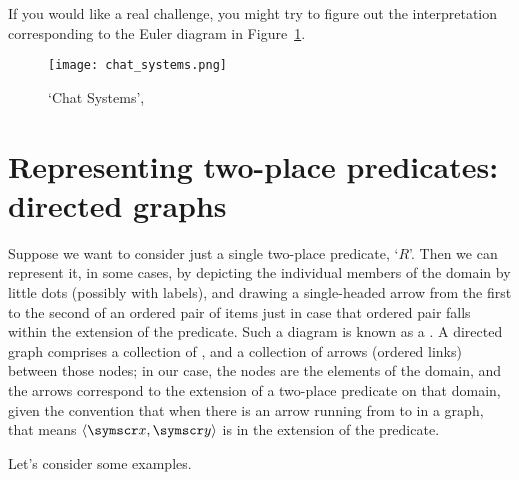 If you would like a real challenge, you might try to figure out the interpretation corresponding to the Euler diagram in Figure~\ref{fig:xkcd}. 
\begin{figure}[b]
	\texttt{[image: chat\_systems.png]}
\caption{`Chat Systems', \label{fig:xkcd}}
\end{figure}

\section{Representing two-place predicates: directed graphs} \label{graph}

Suppose we want to consider just a single two-place predicate, `$R$'. Then we can represent it, in some cases, by depicting the individual members of the domain by little dots (possibly with labels), and drawing a single-headed arrow from the first to the second of an ordered pair of items just in case that ordered pair falls within the extension of the predicate. Such a diagram is known as a . A directed graph comprises a collection of , and a collection of arrows (ordered links) between those nodes; in our case, the nodes are the elements of the domain, and the arrows correspond to the extension of a two-place predicate on that domain, given the convention that when there is an arrow running from  to  in a graph, that means $\langle \meta{x}, \meta{y}\rangle$ is in the extension of the predicate.  

Let's consider some examples.

